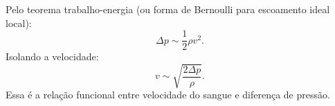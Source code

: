 Pelo teorema trabalho-energia (ou forma de Bernoulli para escoamento ideal local):
\[
\Delta p \sim \frac{1}{2}\rho v^2.
\]
Isolando a velocidade:
\[
v \sim \sqrt{\frac{2\Delta p}{\rho}}.
\]
Essa é a relação funcional entre velocidade do sangue e diferença de pressão.

